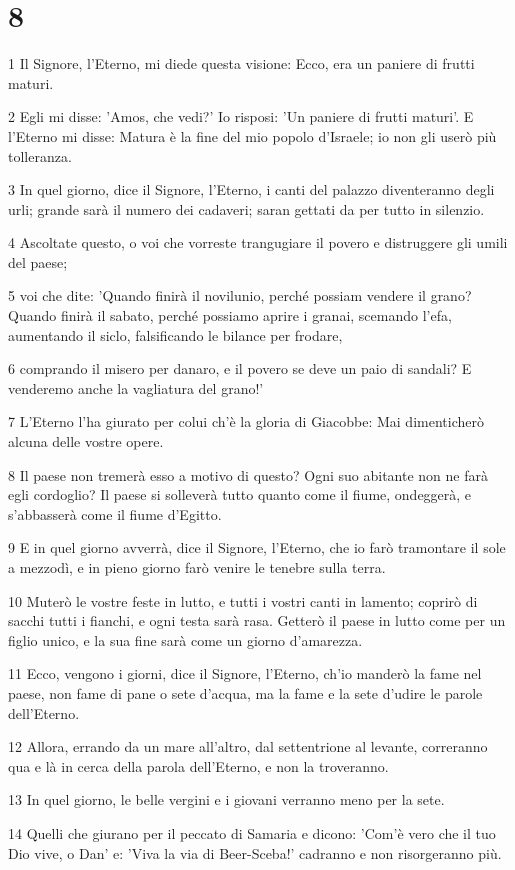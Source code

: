 \chapter{8}

\par 1 Il Signore, l'Eterno, mi diede questa visione: Ecco, era un paniere di frutti maturi.
\par 2 Egli mi disse: 'Amos, che vedi?' Io risposi: 'Un paniere di frutti maturi'. E l'Eterno mi disse: Matura è la fine del mio popolo d'Israele; io non gli userò più tolleranza.
\par 3 In quel giorno, dice il Signore, l'Eterno, i canti del palazzo diventeranno degli urli; grande sarà il numero dei cadaveri; saran gettati da per tutto in silenzio.
\par 4 Ascoltate questo, o voi che vorreste trangugiare il povero e distruggere gli umili del paese;
\par 5 voi che dite: 'Quando finirà il novilunio, perché possiam vendere il grano? Quando finirà il sabato, perché possiamo aprire i granai, scemando l'efa, aumentando il siclo, falsificando le bilance per frodare,
\par 6 comprando il misero per danaro, e il povero se deve un paio di sandali? E venderemo anche la vagliatura del grano!'
\par 7 L'Eterno l'ha giurato per colui ch'è la gloria di Giacobbe: Mai dimenticherò alcuna delle vostre opere.
\par 8 Il paese non tremerà esso a motivo di questo? Ogni suo abitante non ne farà egli cordoglio? Il paese si solleverà tutto quanto come il fiume, ondeggerà, e s'abbasserà come il fiume d'Egitto.
\par 9 E in quel giorno avverrà, dice il Signore, l'Eterno, che io farò tramontare il sole a mezzodì, e in pieno giorno farò venire le tenebre sulla terra.
\par 10 Muterò le vostre feste in lutto, e tutti i vostri canti in lamento; coprirò di sacchi tutti i fianchi, e ogni testa sarà rasa. Getterò il paese in lutto come per un figlio unico, e la sua fine sarà come un giorno d'amarezza.
\par 11 Ecco, vengono i giorni, dice il Signore, l'Eterno, ch'io manderò la fame nel paese, non fame di pane o sete d'acqua, ma la fame e la sete d'udire le parole dell'Eterno.
\par 12 Allora, errando da un mare all'altro, dal settentrione al levante, correranno qua e là in cerca della parola dell'Eterno, e non la troveranno.
\par 13 In quel giorno, le belle vergini e i giovani verranno meno per la sete.
\par 14 Quelli che giurano per il peccato di Samaria e dicono: 'Com'è vero che il tuo Dio vive, o Dan' e: 'Viva la via di Beer-Sceba!' cadranno e non risorgeranno più.

